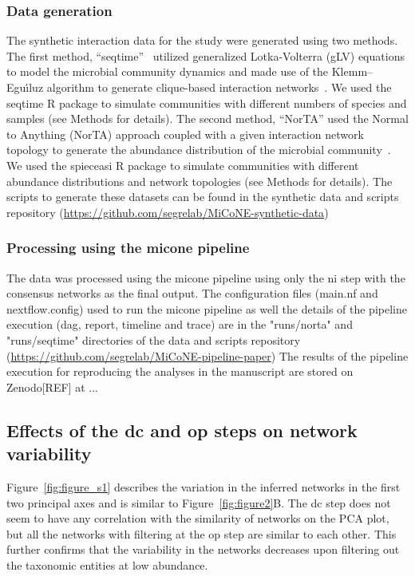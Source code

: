     \subsubsection*{Data generation}
    The synthetic interaction data for the study were generated using two methods.
    The first method, ``seqtime''~\cite{faustSignaturesEcologicalProcesses2018} utilized generalized Lotka-Volterra (gLV) equations to model the microbial community dynamics and made use of the Klemm–Eguı́luz algorithm to generate clique-based interaction networks~\cite{Rottjers2018}.
    We used the seqtime R package to simulate communities with different numbers of species and samples (see Methods for details).
    The second method, ``NorTA'' used the Normal to Anything (NorTA) approach coupled with a given interaction network topology to generate the abundance distribution of the microbial community~\cite{Kurtz2015}.
    We used the spieceasi R package to simulate communities with different abundance distributions and network topologies (see Methods for details).
    The scripts to generate these datasets can be found in the synthetic data and scripts repository (\href{https://github.com/segrelab/MiCoNE-synthetic-data}{https://github.com/segrelab/MiCoNE-synthetic-data})

    \subsubsection*{Processing using the \ac{micone} pipeline}
    The data was processed using the \ac{micone} pipeline using only the \ac{ni} step with the consensus networks as the final output.
    The configuration files (main.nf and nextflow.config) used to run the \ac{micone} pipeline as well the details of the pipeline execution (dag, report, timeline and trace) are in the "runs/norta" and "runs/seqtime" directories of the data and scripts repository (\href{https://github.com/segrelab/MiCoNE-pipeline-paper}{https://github.com/segrelab/MiCoNE-pipeline-paper})
    The results of the pipeline execution for reproducing the analyses in the manuscript are stored on Zenodo[REF] at ...

  \subsection*{Effects of the \ac{dc} and \ac{op} steps on network variability}

    Figure~\ref{fig:figure_s1} describes the variation in the inferred networks in the first two principal axes and is similar to Figure~\ref{fig:figure2}B.
    The \ac{dc} step does not seem to have any correlation with the similarity of networks on the PCA plot, but all the networks with filtering at the \ac{op} step are similar to each other.
    This further confirms that the variability in the networks decreases upon filtering out the taxonomic entities at low abundance.


